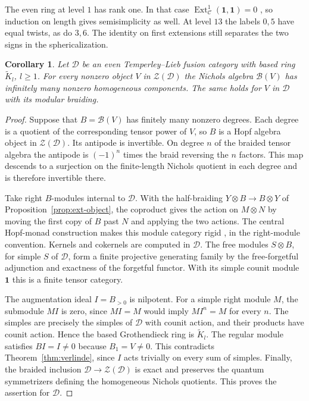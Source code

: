 \documentclass[11pt,reqno]{amsart}
\newtheorem{corollary}[theorem]{Corollary}
\theoremstyle{definition}
\newcommand{\Ext}{\operatorname{Ext}}
\newcommand{\one}{\mathbf 1}
\newcommand{\C}{\mathcal C}
\begin{document}
The even ring at level $1$ has rank one. In that case $\Ext^1_{\C}(\one,\one)=0$ \cite[Theorem~4.4.1]{EGNO}, so induction on length gives semisimplicity as well. At level $13$ the labels $0,5$ have equal twists, as do $3,6$. The identity on first extensions still separates the two signs in the sphericalization.

\begin{corollary}\label{cor:verlinde-nichols}
Let $\mathcal D$ be an even Temperley--Lieb fusion category with based ring $\widetilde K_l$, $l\geq1$. For every nonzero object $V$ in $\mathcal Z(\mathcal D)$ the Nichols algebra $\mathcal B(V)$ has infinitely many nonzero homogeneous components. The same holds for $V$ in $\mathcal D$ with its modular braiding.
\end{corollary}
\begin{proof}
Suppose that $B=\mathcal B(V)$ has finitely many nonzero degrees. Each degree is a quotient of the corresponding tensor power of $V$, so $B$ is a Hopf algebra object in $\mathcal Z(\mathcal D)$. Its antipode is invertible. On degree $n$ of the braided tensor algebra the antipode is $(-1)^n$ times the braid reversing the $n$ factors. This map descends to a surjection on the finite-length Nichols quotient in each degree and is therefore invertible there.

Take right $B$-modules internal to $\mathcal D$. With the half-braiding $Y\otimes B\to B\otimes Y$ of Proposition~\ref{prop:ext-object}, the coproduct gives the action on $M\otimes N$ by moving the first copy of $B$ past $N$ and applying the two actions. The central Hopf-monad construction makes this module category rigid \cite[\S5.3, Proposition~5.4 and Theorem~5.7]{BLV}, in the right-module convention. Kernels and cokernels are computed in $\mathcal D$. The free modules $S\otimes B$, for simple $S$ of $\mathcal D$, form a finite projective generating family by the free-forgetful adjunction and exactness of the forgetful functor. With its simple counit module $\one$ this is a finite tensor category.

The augmentation ideal $I=B_{>0}$ is nilpotent. For a simple right module $M$, the submodule $MI$ is zero, since $MI=M$ would imply $MI^n=M$ for every $n$. The simples are precisely the simples of $\mathcal D$ with counit action, and their products have counit action. Hence the based Grothendieck ring is $\widetilde K_l$. The regular module satisfies $BI=I\ne0$ because $B_1=V\ne0$. This contradicts Theorem~\ref{thm:verlinde}, since $I$ acts trivially on every sum of simples. Finally, the braided inclusion $\mathcal D\to\mathcal Z(\mathcal D)$ is exact and preserves the quantum symmetrizers defining the homogeneous Nichols quotients. This proves the assertion for $\mathcal D$.
\end{proof}
\end{document}
